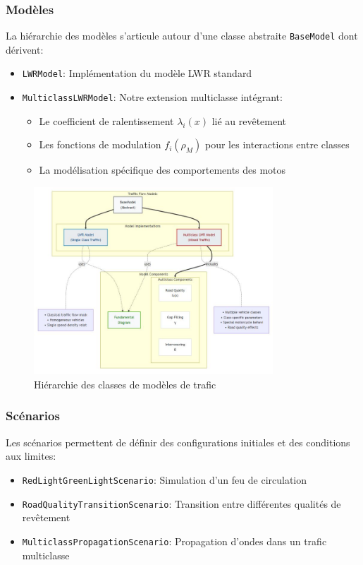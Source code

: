 \subsubsection{Modèles}
La hiérarchie des modèles s'articule autour d'une classe abstraite \texttt{BaseModel} dont dérivent:
\begin{itemize}
\item \texttt{LWRModel}: Implémentation du modèle LWR standard
\item \texttt{MulticlassLWRModel}: Notre extension multiclasse intégrant:
  \begin{itemize}
  \item Le coefficient de ralentissement $\lambda_i(x)$ lié au revêtement
  \item Les fonctions de modulation $f_i(\rho_M)$ pour les interactions entre classes
  \item La modélisation spécifique des comportements des motos
  \end{itemize}
\end{itemize}

\begin{figure}[htbp]
\centering
\includegraphics[width=0.8\textwidth]{images/mermaid/models}
\caption{Hiérarchie des classes de modèles de trafic}
\label{fig:models_hierarchy}
\end{figure}

\subsubsection{Scénarios}
Les scénarios permettent de définir des configurations initiales et des conditions aux limites:
\begin{itemize}
\item \texttt{RedLightGreenLightScenario}: Simulation d'un feu de circulation
\item \texttt{RoadQualityTransitionScenario}: Transition entre différentes qualités de revêtement
\item \texttt{MulticlassPropagationScenario}: Propagation d'ondes dans un trafic multiclasse
\end{itemize}

